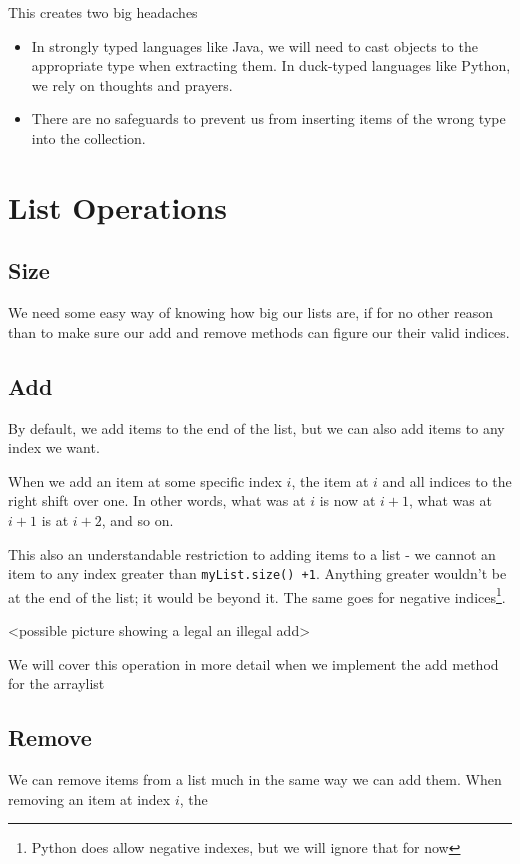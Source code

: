 This creates two big headaches
\begin{itemize}
	
	\item In strongly typed languages like Java, we will need to cast  objects to the appropriate type when extracting them.  In duck-typed languages like Python, we rely on thoughts and prayers.
	\item There are no safeguards to prevent us from inserting items of the wrong type into the collection.
\end{itemize}


\section{List Operations}


\subsection{Size} We need some easy way of knowing how big our lists are, if for no other reason than to make sure our  add and remove methods can figure our their valid indices.


\subsection{Add}  By default, we add items to the end of the list, but we can also add items to any index we want.

When we add an item at some specific index $ i $, the item at $ i $ and all indices to the right shift over one.  In other words, what was at $ i $ is now at $ i+1 $, what was at $ i+1 $ is at $ i+2 $,  and so on.

This also an understandable restriction to adding items to a list -  we cannot an item to any index greater than \texttt{myList.size() +1}.   Anything greater wouldn't be at the end of the list; it would be beyond it.  The same goes for negative indices\footnote{Python does allow negative indexes, but we will ignore that for now}.
 
<possible picture showing a legal an illegal add>

We will cover this operation in more detail when we implement the add method for the arraylist 

\subsection{Remove}  We can remove items from a list much in the same way we can add them. When removing an item at index $i$, the 

